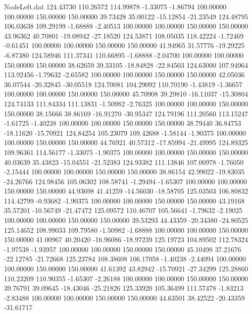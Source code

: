 \begin{filecontents}{NodeLeft.dat}
 124.43730  110.26572  114.99878    -1.33075   -1.86794  100.00000  100.00000  150.00000  150.00000   39.73428   35.00122  -15.12854  -21.23549
 124.48795  106.03638  109.29199    -1.68888   -2.40513  100.00000  100.00000  150.00000  150.00000   43.96362   40.70801  -19.08942  -27.18520
 124.53871  108.05035  118.42224    -1.72469   -0.61451  100.00000  100.00000  150.00000  150.00000   41.94965   31.57776  -19.29225   -6.87380
 124.58946  111.37341  110.66895    -1.68888   -2.04700  100.00000  100.00000  150.00000  150.00000   38.62659   39.33105  -18.84828  -22.84503
 124.63000  107.94964  113.92456    -1.79632   -2.65582  100.00000  100.00000  150.00000  150.00000   42.05036   36.07544  -20.32845  -30.05518
 124.70081  104.29092  110.70190    -1.43819   -1.36657  100.00000  100.00000  150.00000  150.00000   45.70908   39.29810  -16.11037  -15.30804
 124.74133  111.84334  111.13831    -1.50982   -2.76325  100.00000  100.00000  150.00000  150.00000   38.15666   38.86169  -16.91270  -30.95347
 124.79196  111.20560  113.15247    -1.61725   -1.40238  100.00000  100.00000  150.00000  150.00000   38.79440   36.84753  -18.11620  -15.70921
 124.84254  105.23079  109.42688    -1.58144   -1.90375  100.00000  100.00000  150.00000  150.00000   44.76921   40.57312  -17.85994  -21.49995
 124.89325  109.96361  114.56177    -1.33075   -1.90375  100.00000  100.00000  150.00000  150.00000   40.03639   35.43823  -15.04551  -21.52383
 124.93382  111.13846  107.00978    -1.76050   -2.15444  100.00000  100.00000  150.00000  150.00000   38.86154   42.99022  -19.83035  -24.26766
 124.98456  105.06302  108.58741    -1.29494   -1.65307  100.00000  100.00000  150.00000  150.00000   44.93698   41.41259  -14.56030  -18.58705
 125.03503  106.80832  114.42799    -0.93682   -1.90375  100.00000  100.00000  150.00000  150.00000   43.19168   35.57201  -10.56749  -21.47472
 125.09572  110.46707  105.56641    -1.79632   -2.19025  100.00000  100.00000  150.00000  150.00000   39.53293   44.43359  -20.34380  -24.80525
 125.14652  108.99033  109.79580    -1.50982   -1.68888  100.00000  100.00000  150.00000  150.00000   41.00967   40.20420  -16.96086  -18.97239
 125.19723  104.89502  112.78324    -1.97538   -1.93957  100.00000  100.00000  150.00000  150.00000   45.10498   37.21676  -22.12785  -21.72668
 125.23784  108.38608  106.17058    -1.40238   -2.44094  100.00000  100.00000  150.00000  150.00000   41.61392   43.82942  -15.70921  -27.34299
 125.28860  110.23209  110.90355    -1.65307   -2.26188  100.00000  100.00000  150.00000  150.00000   39.76791   39.09645  -18.43046  -25.21826
 125.33920  105.36499  111.57478    -1.83213   -2.83488  100.00000  100.00000  150.00000  150.00000   44.63501   38.42522  -20.43359  -31.61717

\end{filecontents}
